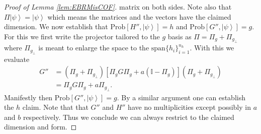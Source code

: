 \documentclass{theoretics}
\begin{document}
\begin{proof}[Proof of Lemma \ref{lem:EBRMisCOF}]
matrix on both sides. Note also that $\Pi\left|\psi\right\rangle =\left|\psi\right\rangle $
which means the matrices and the vectors have the claimed dimension.
We now establish that $\text{Prob}[H'',\left|\psi\right\rangle ]=h$
and $\text{Prob}[G'',\left|\psi\right\rangle ]=g$. For this we first
write the projector tailored to the $g$ basis as $\Pi=\Pi_{g}+\Pi_{g_{\perp}}$
where $\Pi_{g_{\perp}}$ is meant to enlarge the space to the $\text{span}\{h_{i}\}_{i=1}^{n_{h}}$.
With this we evaluate 
\begin{align*}
G'' & =\left(\Pi_{g}+\Pi_{g_{\perp}}\right)\left[\Pi_{g}G\Pi_{g}+a(\mathbb{I}-\Pi_{g})\right]\left(\Pi_{g}+\Pi_{g_{\perp}}\right)\\
 & =\Pi_{g}G\Pi_{g}+a\Pi_{g_{\perp}}.
\end{align*}
Manifestly then $\text{Prob}[G'',\left|\psi\right\rangle ]=g$. By
a similar argument one can establish the $h$ claim. Note that that
$G''$ and $H''$ have no multiplicities except possibly in $a$ and
$b$ respectively. Thus we conclude we can always restrict to the
claimed dimension and form.
\end{proof}

%

%

%
%
%
%
%
%
%
%
%
%
%
%
%
%
%
%
%
%
%
%


%

%
%
%
%
%

%
%
%
%
%
%
%
%
%
%
%
%
%
%
%
%
%
	
%
%
%
%
%
%
%

%
%
%
%
%
%
%
%
%
%
%
%
%
%
%
%
%
%

%
%
%



%

%
	
%
%
%
	 
%
%
%
%
%
%
%
%
%
%
%
%
%
%
%
	
%
%
%
%

%

%
%
%
%
%
%
%
%
%
%
%
%
%
%
%
%
%
%
%
%
%
%
%
%
%
%
%
%
%
%
%
%
%
%
%

%
%
%
%

%
%
%
%
%
%
%
%
%
%
%
%
%
%
%
%
%
%
%
%
%
%
%
%
%
%
%
%
%
%
%
%
%
%
%
%
%
%
%
%
%
%
%





%
%
%
%
%
%
%
%
%
%
%
%
%
	
	
%
%
%
%
%
%
%
\end{document}
